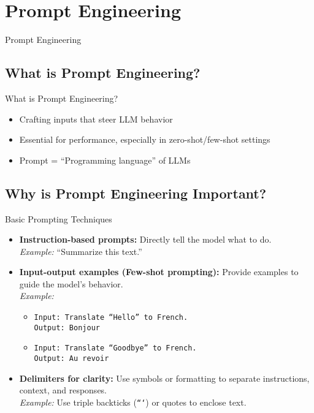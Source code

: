 \section{Prompt Engineering}
\begin{frame}{}
    \LARGE Prompt Engineering
\end{frame}

\subsection{What is Prompt Engineering?}
\begin{frame}{What is Prompt Engineering?}
    \begin{itemize}
        \setlength{\itemsep}{1em}
        \item Crafting inputs that steer LLM behavior
        \item Essential for performance, especially in zero-shot/few-shot settings
        \item Prompt = ``Programming language'' of LLMs
    \end{itemize}
\end{frame}

\subsection{Why is Prompt Engineering Important?}
\begin{frame}{Basic Prompting Techniques}
    \begin{itemize}
        \item \textbf{Instruction-based prompts:} Directly tell the model what to do.\\
        \textit{Example:} ``Summarize this text.''
        \item \textbf{Input-output examples (Few-shot prompting):} Provide examples to guide the model's behavior.\\
        \textit{Example:}
        \begin{itemize}
            \item \texttt{Input: Translate ``Hello'' to French.\\ Output: Bonjour}
            \item \texttt{Input: Translate ``Goodbye'' to French.\\ Output: Au revoir}
        \end{itemize}
        \item \textbf{Delimiters for clarity:} Use symbols or formatting to separate instructions, context, and responses.\\
        \textit{Example:} Use triple backticks (\texttt{```}) or quotes to enclose text.
    \end{itemize}
\end{frame}

